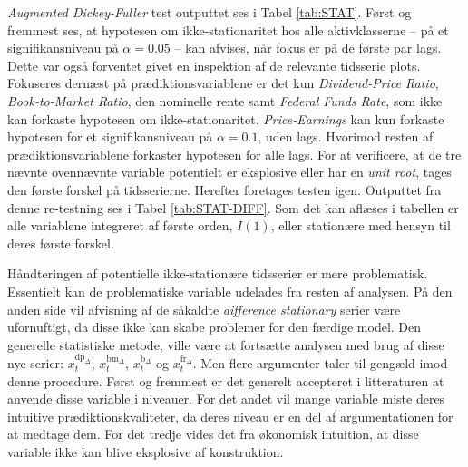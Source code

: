 \documentclass[
  a4paper,
  oneside]{memoir}
\begin{document}
\emph{Augmented Dickey-Fuller} test outputtet ses i Tabel \ref{tab:STAT}. Først og fremmest ses, at hypotesen om ikke-stationaritet hos alle aktivklasserne -- på et signifikansniveau på \(\alpha=0.05\) -- kan afvises, når fokus er på de første par lags. Dette var også forventet givet en inspektion af de relevante tidsserie plots. Fokuseres dernæst på prædiktionsvariablene er det kun \emph{Dividend-Price Ratio}, \emph{Book-to-Market Ratio}, den nominelle rente samt \emph{Federal Funds Rate}, som ikke kan forkaste hypotesen om ikke-stationaritet. \emph{Price-Earnings} kan kun forkaste hypotesen for et signifikansniveau på \(\alpha=0.1\), uden lags. Hvorimod resten af prædiktionsvariablene forkaster hypotesen for alle lags. For at verificere, at de tre nævnte ovennævnte variable potentielt er eksplosive eller har en \emph{unit root}, tages den første forskel på tidsserierne. Herefter foretages testen igen. Outputtet fra denne re-testning ses i Tabel \ref{tab:STAT-DIFF}. Som det kan aflæses i tabellen er alle variablene integreret af første orden, \(I(1)\), eller stationære med hensyn til deres første forskel.

Håndteringen af potentielle ikke-stationære tidsserier er mere problematisk. Essentielt kan de problematiske variable udelades fra resten af analysen. På den anden side vil afvisning af de såkaldte \emph{difference stationary} serier være ufornuftigt, da disse ikke kan skabe problemer for den færdige model. Den generelle statistiske metode, ville være at fortsætte analysen med brug af disse nye serier: \(x_t^{\text{dp}_{\Delta}}\), \(x_t^{\text{bm}_{\Delta}}\), \(x_t^{\text{b}_{\Delta}}\) og \(x_t^{\text{fr}_{\Delta}}\). Men flere argumenter taler til gengæld imod denne procedure. Først og fremmest er det generelt accepteret i litteraturen at anvende disse variable i niveauer. For det andet vil mange variable miste deres intuitive prædiktionskvaliteter, da deres niveau er en del af argumentationen for at medtage dem. For det tredje vides det fra økonomisk intuition, at disse variable ikke kan blive eksplosive af konstruktion.
\end{document}

